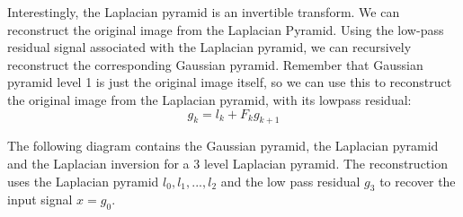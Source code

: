 Interestingly, the Laplacian pyramid is an invertible transform.  We can reconstruct the original image from the Laplacian Pyramid. Using the low-pass residual signal associated with the Laplacian
pyramid, we can recursively reconstruct the corresponding Gaussian pyramid.  Remember that Gaussian pyramid level 1 is just the original image itself, so we can use this to reconstruct the original image
from the Laplacian pyramid, with its lowpass residual:
\begin{equation}
	g_k = l_k + F_k g_{k+1}
	\label{eq:laplaceRecursion}
\end{equation}

The following diagram contains the Gaussian pyramid, the Laplacian pyramid and the Laplacian inversion for a 3 level Laplacian pyramid. The reconstruction uses the Laplacian pyramid $l_0,l_1,...,l_2$ and the low pass residual $g_3$ to recover the input signal $x=g_0$.


